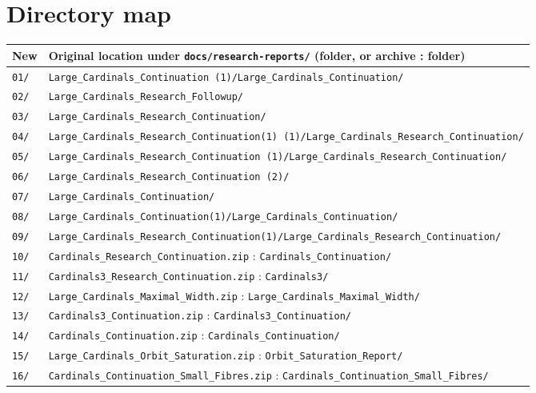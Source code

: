 \documentclass[11pt,letterpaper]{article}
\theoremstyle{definition}
\numberwithin{equation}{section}
\begin{document}
\section{Directory map}\label{app:map}

\begin{center}
\small
\renewcommand{\arraystretch}{1.12}
\begin{tabularx}{\textwidth}{@{}lY@{}}
\toprule
\textbf{New}&\textbf{Original location under \nolinkurl{docs/research-reports/} (folder, or archive : folder)}\\\midrule
\nolinkurl{01/}&\nolinkurl{Large_Cardinals_Continuation (1)/Large_Cardinals_Continuation/}\\
\nolinkurl{02/}&\nolinkurl{Large_Cardinals_Research_Followup/}\\
\nolinkurl{03/}&\nolinkurl{Large_Cardinals_Research_Continuation/}\\
\nolinkurl{04/}&\nolinkurl{Large_Cardinals_Research_Continuation(1) (1)/Large_Cardinals_Research_Continuation/}\\
\nolinkurl{05/}&\nolinkurl{Large_Cardinals_Research_Continuation (1)/Large_Cardinals_Research_Continuation/}\\
\nolinkurl{06/}&\nolinkurl{Large_Cardinals_Research_Continuation (2)/}\\
\nolinkurl{07/}&\nolinkurl{Large_Cardinals_Continuation/}\\
\nolinkurl{08/}&\nolinkurl{Large_Cardinals_Continuation(1)/Large_Cardinals_Continuation/}\\
\nolinkurl{09/}&\nolinkurl{Large_Cardinals_Research_Continuation(1)/Large_Cardinals_Research_Continuation/}\\
\nolinkurl{10/}&\nolinkurl{Cardinals_Research_Continuation.zip} : \nolinkurl{Cardinals_Continuation/}\\
\nolinkurl{11/}&\nolinkurl{Cardinals3_Research_Continuation.zip} : \nolinkurl{Cardinals3/}\\
\nolinkurl{12/}&\nolinkurl{Large_Cardinals_Maximal_Width.zip} : \nolinkurl{Large_Cardinals_Maximal_Width/}\\
\nolinkurl{13/}&\nolinkurl{Cardinals3_Continuation.zip} : \nolinkurl{Cardinals3_Continuation/}\\
\nolinkurl{14/}&\nolinkurl{Cardinals_Continuation.zip} : \nolinkurl{Cardinals_Continuation/}\\
\nolinkurl{15/}&\nolinkurl{Large_Cardinals_Orbit_Saturation.zip} : \nolinkurl{Orbit_Saturation_Report/}\\
\nolinkurl{16/}&\nolinkurl{Cardinals_Continuation_Small_Fibres.zip} : \nolinkurl{Cardinals_Continuation_Small_Fibres/}\\

\end{tabularx}
\end{center}
\end{document}
